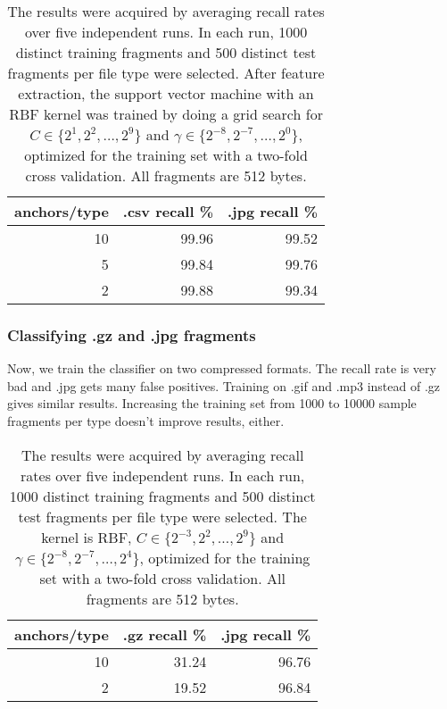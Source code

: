 \begin{table}[h]
\begin{tabular}{rrr}
\hline
   anchors/type &   .csv recall \% &   .jpg recall \% \\
\hline
             10 &           99.96 &           99.52 \\
              5 &           99.84 &           99.76 \\
              2 &           99.88 &           99.34 \\
\hline
\end{tabular}
\caption{
The results were acquired by averaging recall rates over five
independent runs. In each run, 1000 distinct training fragments and 500
distinct test fragments per file type were selected. After feature
extraction, the support vector machine with an RBF kernel was trained by doing a grid search
for $C \in \{ 2^{1}, 2^{2}, \dots, 2^{9} \}$ and $\gamma \in \{2^{-8},
2^{-7}, \dots, 2^{0} \}$, optimized for the training set with a two-fold
cross validation. All fragments are 512 bytes.}
\label{table:csv_jpg_recall}
\end{table}

\subsubsection{Classifying .gz and .jpg fragments}

Now, we train the classifier on two compressed formats. The recall rate is
very bad and .jpg gets many false positives. Training on .gif and .mp3
instead of .gz gives similar results. Increasing the training set from 1000 to 10000 sample fragments per type doesn't improve results, either.

\begin{table}[h]
\begin{tabular}{rrr}
\hline
   anchors/type &   .gz recall \% &   .jpg recall \% \\
\hline
             10 &           31.24 &           96.76 \\
              2 &           19.52 &           96.84 \\
\hline
\end{tabular}
\caption{
The results were acquired by averaging recall rates over five
independent runs. In each run, 1000 distinct training fragments and 500
distinct test fragments per file type were selected. The kernel is RBF, $C
\in \{ 2^{-3}, 2^{2}, \dots, 2^{9} \}$ and $\gamma \in \{2^{-8}, 2^{-7},
\dots, 2^{4} \}$, optimized for the training set with a two-fold cross
validation. All fragments are 512 bytes.} \label{table:gz_jpg_recall}
\end{table}




